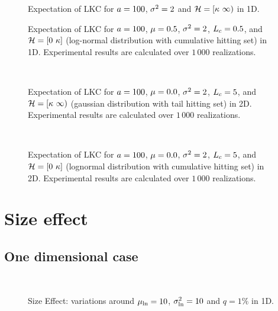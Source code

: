 \documentclass[a4paper,12pt]{article}
\begin{document}
\begin{figure}[!h]
  \centering
  \hfill
  \subfigure[Length]{\scalebox{0.5}{}} 
  \caption{Expectation of LKC for $a=100$, $\sigma^2=2$ and $\mathcal{H}=[\kappa\ \infty)$ in 1D.}
\end{figure}

\begin{figure}[!h]
  \centering
  \subfigure{\scalebox{0.5}{}}\hfill
  \subfigure{\scalebox{0.5}{}} 
  \caption{Expectation of LKC for $a=100$, $\mu=0.5$, $\sigma^2=2$, $L_c=0.5$, and $\mathcal{H}=[0\ \kappa]$ (log-normal distribution with cumulative hitting set) in 1D. Experimental results are calculated over $1\,000$ realizations.}
\end{figure}

\begin{figure}[!h]
  \centering
  \subfigure{\scalebox{0.5}{}}\hfill
  \subfigure{\scalebox{0.5}{}}\\
  \subfigure{\scalebox{0.5}{}} 
  \caption{Expectation of LKC for $a=100$, $\mu=0.0$, $\sigma^2=2$, $L_c=5$, and $\mathcal{H}=[\kappa\ \infty)$ (gaussian distribution with tail hitting set) in 2D. Experimental results are calculated over $1\,000$ realizations.}
\end{figure}

\begin{figure}[!h]
  \centering
  \subfigure{\scalebox{0.5}{}}\hfill
  \subfigure{\scalebox{0.5}{}}\\
  \subfigure{\scalebox{0.5}{}} 
  \caption{Expectation of LKC for $a=100$, $\mu=0.0$, $\sigma^2=2$, $L_c=5$, and $\mathcal{H}=[0\ \kappa]$ (lognormal distribution with cumulative hitting set) in 2D. Experimental results are calculated over $1\,000$ realizations.}
\end{figure}


\section{Size effect}
\subsection{One dimensional case}
\begin{figure}[!h]
  \centering
  \hfill
   \\
  \caption{Size Effect: variations around $\mu_{\ln}=10$, $\sigma_{\ln}^2=10$ and $q=1\%$ in 1D.}
\end{figure}
\end{document}
